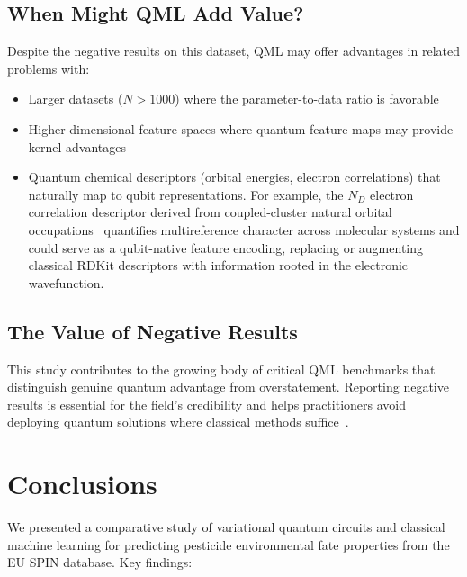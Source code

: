 \documentclass[twoside,twocolumn,9pt]{article}
\begin{document}
\subsection{When Might QML Add Value?}

Despite the negative results on this dataset, QML may offer advantages in
related problems with:
\begin{itemize}[nosep]
  \item Larger datasets ($N > 1000$) where the parameter-to-data ratio
        is favorable
  \item Higher-dimensional feature spaces where quantum feature maps
        may provide kernel advantages~\cite{havlicek2019}
  \item Quantum chemical descriptors (orbital energies, electron
        correlations) that naturally map to qubit representations.
        For example, the $N_D$ electron correlation descriptor derived
        from coupled-cluster natural orbital occupations~\cite{arda2026nd}
        quantifies multireference character across molecular systems and
        could serve as a qubit-native feature encoding, replacing or
        augmenting classical RDKit descriptors with information rooted
        in the electronic wavefunction.
\end{itemize}

\subsection{The Value of Negative Results}

This study contributes to the growing body of critical QML benchmarks that
distinguish genuine quantum advantage from overstatement. Reporting negative results
is essential for the field's credibility and helps practitioners avoid
deploying quantum solutions where classical methods
suffice~\cite{cerezo2021}.


\section{Conclusions}
\label{sec:conclusions}

We presented a comparative study of variational quantum circuits
and classical machine learning for predicting pesticide environmental fate
properties from the EU SPIN database. Key findings:
\end{document}
